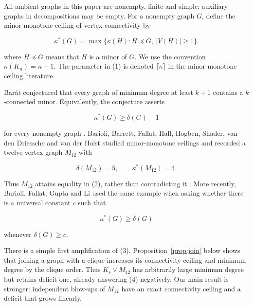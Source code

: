 \documentclass[11pt]{article}
\begin{document}
All ambient graphs in this paper are nonempty, finite and simple; auxiliary
graphs in decompositions may be empty. For a nonempty graph $G$, define the
minor-monotone ceiling of vertex connectivity by

\nopagebreak[4]
\[
\kappa^*(G)=\max\{\kappa(H):H\preccurlyeq G,\ |V(H)|\geq1\}. \tag{1}
\]

where $H\preccurlyeq G$ means that $H$ is a minor of $G$. We use the convention
$\kappa(K_n)=n-1$. The parameter in (1) is denoted $\lceil\kappa\rceil$ in the
minor-monotone ceiling literature.

Barát conjectured that every graph of minimum degree at least $k+1$ contains a
$k$-connected minor. Equivalently, the conjecture asserts

\nopagebreak[4]
\[
\kappa^*(G)\geq\delta(G)-1                                  \tag{2}
\]

for every nonempty graph \cite{barat}. Barioli, Barrett, Fallat, Hall, Hogben, Shader, van
den Driessche and van der Holst studied minor-monotone ceilings and recorded a
twelve-vertex graph $M_{12}$ with

\nopagebreak[4]
\[
\delta(M_{12})=5,
\qquad
\kappa^*(M_{12})=4.                                         \tag{3}
\]

Thus $M_{12}$ attains equality in (2), rather than contradicting it \cite{barioli2013}. More
recently, Barioli, Fallat, Gupta and Li used the same example when asking \cite{barioli2026}
whether there is a universal constant $c$ such that

\nopagebreak[4]
\[
\kappa^*(G)\geq\delta(G)                                    \tag{4}
\]

whenever $\delta(G)\geq c$.

There is a simple first amplification of (3). Proposition~\ref{prop:join} below shows that
joining a graph with a clique increases its connectivity ceiling and minimum
degree by the clique order. Thus $K_s\vee M_{12}$ has arbitrarily large minimum
degree but retains deficit one, already answering (4) negatively. Our main
result is stronger: independent blow-ups of $M_{12}$ have an exact connectivity
ceiling and a deficit that grows linearly.
\end{document}
